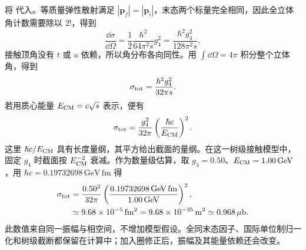 \begin{exbox}
将 代入。等质量弹性散射满足 $|\mathbf p_f|=|\mathbf p_i|$，末态两个标量完全相同，因此全立体角计数需要除以 $2!$，得到
\begin{equation*}
 \frac{\dd\sigma}{\dd\Omega}
 =\frac12\frac{\hbar^2}{64\pi^2s}g_4^2
 =\frac{\hbar^2g_4^2}{128\pi^2s},
\end{equation*}
接触顶角没有 $t$ 或 $u$ 依赖，所以角分布各向同性。用 $\int\dd\Omega=4\pi$ 积分整个立体角，得到
\begin{equation}
 \sigma_{\rm tot}
 =\frac{\hbar^2g_4^2}{32\pi s}.
 \label{eq:phi4-total-cross-dp64}
\end{equation}
若用质心能量 $E_{\rm CM}=c\sqrt{s}$ 表示，便有
\begin{equation*}
 \sigma_{\rm tot}
 =\frac{g_4^2}{32\pi}
 \left(\frac{\hbar c}{E_{\rm CM}}\right)^2.
\end{equation*}
这里 $\hbar c/E_{\rm CM}$ 具有长度量纲，其平方给出截面的量纲。在这一树级接触模型中，固定 $g_4$ 时截面按 $E_{\rm CM}^{-2}$ 衰减。作为数量级估算，取 $g_4=0.50$、$E_{\rm CM}=1.00\,\mathrm{GeV}$，用 $\hbar c=0.19732698\,\mathrm{GeV\,fm}$ 得
\begin{align*}
 \sigma_{\rm tot}
 &=\frac{0.50^2}{32\pi}
 \left(\frac{0.19732698\,\mathrm{GeV\,fm}}{1.00\,\mathrm{GeV}}\right)^2,\\
 &\simeq9.68\times10^{-5}\,\mathrm{fm^2}
 =9.68\times10^{-35}\,\mathrm{m^2}
 \simeq0.968\,\mu\mathrm b.
\end{align*}
此数值来自同一振幅与相空间，不增加模型假设。全同末态因子、国际单位制归一化和树级截断都保留在计算中；加入圈修正后，振幅及其能量依赖还会改变。
\end{exbox}




